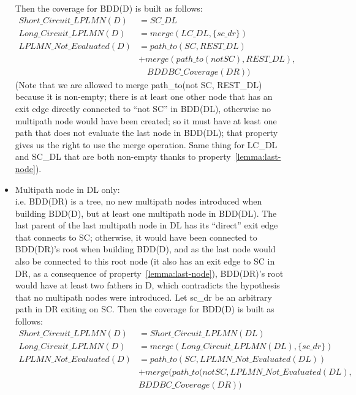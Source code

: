 \documentclass[a4paper,12pt,twoside]{article}
\begin{document}
\begin{description}
\begin{itemize}
    Then the coverage for BDD(D) is built as follows:
    \begin{align*}
    Short\_Circuit\_LPLMN(D) & = SC\_DL\\
    Long\_Circuit\_LPLMN(D)  & = merge(LC\_DL, \{sc\_dr\})\\
    LPLMN\_Not\_Evaluated(D) & = path\_to(SC, REST\_DL)\\
                            & + merge(path\_to(not SC), REST\_DL),\\
                            & \quad BDDBC\_Coverage(DR))
    \end{align*}
    (Note that we are allowed to merge path\_to(not SC, REST\_DL) because
    it is non-empty; there is at least one other node that has an exit
    edge directly connected to ``not SC'' in BDD(DL), otherwise no
    multipath node would have been created; so it must have at least one path
    that does not evaluate the last node in BDD(DL); that property
    gives us the right to use the merge operation. Same thing for LC\_DL
    and SC\_DL that are both non-empty thanks to
    property~\ref{lemma:last-node}).

  \item Multipath node in DL only:\\
    i.e. BDD(DR) is a tree, no new multipath nodes introduced when
    building BDD(D), but at least one multipath node in BDD(DL). The last
    parent of the last multipath node in DL has its ``direct'' exit edge
    that connects to SC; otherwise, it would have been connected to
    BDD(DR)'s root when building BDD(D), and as the last node would
    also be connected to this root node (it also has an exit edge to
    SC in DR, as a consequence of property~\ref{lemma:last-node}), BDD(DR)'s
    root would have at least two fathers in D, which contradicts the
    hypothesis that no multipath nodes were introduced.  Let sc\_dr be an
    arbitrary path in DR exiting on SC.  Then the coverage for BDD(D)
    is built as follows:
    \begin{align*}
    Short\_Circuit\_LPLMN(D) & = Short\_Circuit\_LPLMN(DL)\\
    Long\_Circuit\_LPLMN(D)  & = merge(Long\_Circuit\_LPLMN(DL), \{sc\_dr\})\\
    LPLMN\_Not\_Evaluated(D) & = path\_to(SC, LPLMN\_Not\_Evaluated(DL))\\
                         & + merge(path\_to(not SC, LPLMN\_Not\_Evaluated(DL),\\
                         & BDDBC\_Coverage(DR))
    \end{align*}
  \end{itemize}
\end{description}
\end{document}
